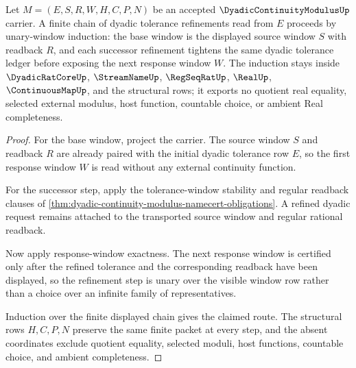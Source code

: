 \begin{theorem}
\label{thm:dyadic-continuity-modulus-window-induction}
Let $M=(E,S,R,W,H,C,P,N)$ be an accepted $\DyadicContinuityModulusUp$ carrier. A finite chain of dyadic tolerance refinements read from $E$ proceeds by unary-window induction: the base window is the displayed source window $S$ with readback $R$, and each successor refinement tightens the same dyadic tolerance ledger before exposing the next response window $W$. The induction stays inside $\DyadicRatCoreUp$, $\StreamNameUp$, $\RegSeqRatUp$, $\RealUp$, $\ContinuousMapUp$, and the structural rows; it exports no quotient real equality, selected external modulus, host function, countable choice, or ambient Real completeness.
\end{theorem}
\begin{proof}
For the base window, project the carrier. The source window $S$ and readback $R$ are already paired with the initial dyadic tolerance row $E$, so the first response window $W$ is read without any external continuity function.

For the successor step, apply the tolerance-window stability and regular readback clauses of \autoref{thm:dyadic-continuity-modulus-namecert-obligations}. A refined dyadic request remains attached to the transported source window and regular rational readback.

Now apply response-window exactness. The next response window is certified only after the refined tolerance and the corresponding readback have been displayed, so the refinement step is unary over the visible window row rather than a choice over an infinite family of representatives.

Induction over the finite displayed chain gives the claimed route. The structural rows $H,C,P,N$ preserve the same finite packet at every step, and the absent coordinates exclude quotient equality, selected moduli, host functions, countable choice, and ambient completeness.
\end{proof}



